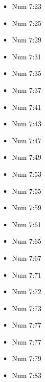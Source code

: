 \documentclass[14pt]{article}
\begin{document}
\begin{multicols}{2}
\begin{itemize}
\item Num 7:23

\item Num 7:25

\item Num 7:29

\item Num 7:31

\item Num 7:35

\item Num 7:37

\item Num 7:41

\item Num 7:43

\item Num 7:47

\item Num 7:49

\item Num 7:53

\item Num 7:55

\item Num 7:59

\item Num 7:61

\item Num 7:65

\item Num 7:67

\item Num 7:71

\item Num 7:72

\item Num 7:73

\item Num 7:77

\item Num 7:77

\item Num 7:79

\item Num 7:83


\end{itemize}
\end{multicols}
\end{document}
